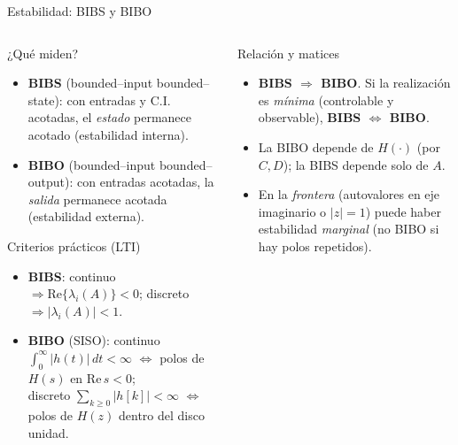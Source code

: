 \documentclass[
    10pt,
    aspectratio=169,
    xcolor={dvipsnames},
    spanish,
    ]{beamer}
\begin{document}
\begin{frame}{Estabilidad: BIBS y BIBO}
\footnotesize
\begin{columns}[T]
  \begin{column}{0.56\textwidth}
    \begin{block}{¿Qué miden?}
      \begin{itemize}\itemsep2pt
        \item \textbf{BIBS} (bounded–input bounded–state): con entradas y C.I. acotadas, el \emph{estado} permanece acotado (estabilidad interna).
        \item \textbf{BIBO} (bounded–input bounded–output): con entradas acotadas, la \emph{salida} permanece acotada (estabilidad externa).
      \end{itemize}
    \end{block}
    \begin{block}{Criterios prácticos (LTI)}
      \begin{itemize}\itemsep2pt
        \item \textbf{BIBS}: continuo $\Rightarrow \mathrm{Re}\{\lambda_i(A)\}<0$;\; discreto $\Rightarrow |\lambda_i(A)|<1$.
        \item \textbf{BIBO} (SISO): continuo $\int_0^{\infty}|h(t)|\,dt<\infty$ $\Leftrightarrow$ polos de $H(s)$ en $\mathrm{Re}\,s<0$;\\
        discreto $\sum_{k\ge 0}|h[k]|<\infty$ $\Leftrightarrow$ polos de $H(z)$ dentro del disco unidad.
      \end{itemize}
    \end{block}
  \end{column}
  \begin{column}{0.42\textwidth}
    \begin{block}{Relación y matices}
      \begin{itemize}\itemsep2pt
        \item \textbf{BIBS $\Rightarrow$ BIBO}. Si la realización es \emph{mínima} (controlable y observable), \textbf{BIBS $\Leftrightarrow$ BIBO}.
        \item La BIBO depende de $H(\cdot)$ (por $C,D$); la BIBS depende solo de $A$.
        \item En la \emph{frontera} (autovalores en eje imaginario o $|z|{=}1$) puede haber estabilidad \emph{marginal} (no BIBO si hay polos repetidos).
      \end{itemize}
    \end{block}
  \end{column}
\end{columns}
\end{frame}
\end{document}
